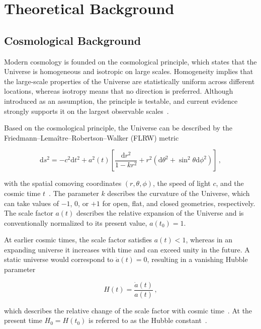 \chapter{Theoretical Background} \label{ch:theoretical_background}

\section{Cosmological Background} \label{sec:cosmological_background}
Modern cosmology is founded on the cosmological principle, which states that the Universe 
is homogeneous and isotropic on large scales. Homogeneity implies that the large-scale properties of the Universe 
are statistically uniform across different locations, whereas isotropy means that no direction is preferred. 
Although introduced as an assumption, the principle is testable, and current evidence strongly supports it on the largest 
observable scales~\cite{Scrimgeour_2012, Laurent_2016}.

Based on the cosmological principle, the Universe can be described by the Friedmann--Lemaître--Robertson--Walker (FLRW) metric

\begin{equation}
    \mathrm{d}s^2 = -c^2 \mathrm{d}t^2 +a^2(t) \left[ \frac{\mathrm{d}r^2}{1 - k r^2} + r^2 (\mathrm{d}\theta^2 + \sin^2\theta \mathrm{d}\phi^2) \right] \,,
\end{equation}

with the spatial comoving coordinates $(r, \theta, \phi)$, the speed of light $c$, and the cosmic time $t$~\cite{CervantesCota_2011}. The parameter $k$ describes the curvature of the Universe, 
which can take values of $-1$, $0$, or $+1$ for open, flat, and closed geometries, respectively. 
The scale factor $a(t)$ describes the relative expansion of the Universe and is conventionally normalized to its present value,
$
    a(t_0)=1$.

At earlier cosmic times, the scale factor satisfies $a(t)<1$, whereas in an expanding universe it increases with time and can exceed unity in the future. 
A static universe would correspond to $\dot{a}(t)=0$, resulting in a vanishing Hubble parameter

\begin{equation}
    H(t)=\frac{\dot{a}(t)}{a(t)} \,,
\end{equation}

which describes the relative change of the scale factor with cosmic time~\cite{Huterer_2018}. 
At the present time
$
    H_0 = H(t_0)
$
is referred to as the Hubble constant~\cite{CervantesCota_2011}.

